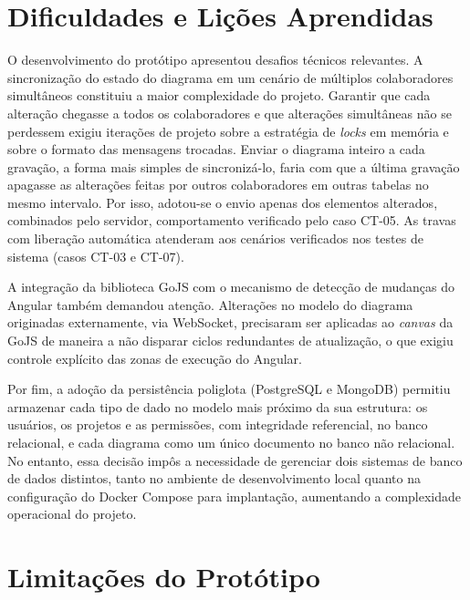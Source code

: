 \section{Dificuldades e Lições Aprendidas}

O desenvolvimento do protótipo apresentou desafios técnicos relevantes. A sincronização do estado do diagrama em um cenário de múltiplos colaboradores simultâneos constituiu a maior complexidade do projeto. Garantir que cada alteração chegasse a todos os colaboradores e que alterações simultâneas não se perdessem exigiu iterações de projeto sobre a estratégia de \textit{locks} em memória e sobre o formato das mensagens trocadas. Enviar o diagrama inteiro a cada gravação, a forma mais simples de sincronizá-lo, faria com que a última gravação apagasse as alterações feitas por outros colaboradores em outras tabelas no mesmo intervalo. Por isso, adotou-se o envio apenas dos elementos alterados, combinados pelo servidor, comportamento verificado pelo caso CT-05. As travas com liberação automática atenderam aos cenários verificados nos testes de sistema (casos CT-03 e CT-07).

A integração da biblioteca GoJS com o mecanismo de detecção de mudanças do Angular também demandou atenção. Alterações no modelo do diagrama originadas externamente, via WebSocket, precisaram ser aplicadas ao \textit{canvas} da GoJS de maneira a não disparar ciclos redundantes de atualização, o que exigiu controle explícito das zonas de execução do Angular.

Por fim, a adoção da persistência poliglota (PostgreSQL e MongoDB) permitiu armazenar cada tipo de dado no modelo mais próximo da sua estrutura: os usuários, os projetos e as permissões, com integridade referencial, no banco relacional, e cada diagrama como um único documento no banco não relacional. No entanto, essa decisão impôs a necessidade de gerenciar dois sistemas de banco de dados distintos, tanto no ambiente de desenvolvimento local quanto na configuração do Docker Compose para implantação, aumentando a complexidade operacional do projeto.

\section{Limitações do Protótipo}
\label{sec:limitacoes}

